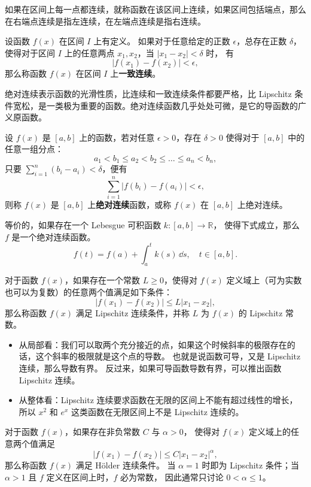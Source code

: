 如果在区间上每一点都连续，就称函数在该区间上连续，如果区间包括端点，那么在右端点连续是指左连续，在左端点连续是指右连续。

\begin{definition}[一致连续]
设函数 $f(x)$ 在区间 $I$ 上有定义。
如果对于任意给定的正数 $\epsilon$，总存在正数 $\delta$，使得对于区间 $I$ 上的任意两点 $x_1,x_2$，当 $|x_1-x_2|<\delta$ 时，
有 \[
|f(x_1)-f(x_2)|<\epsilon,
\] 那么称函数 $f(x)$ 在区间 $I$ 上\textbf{一致连续}。
\end{definition}

绝对连续表示函数的光滑性质，比连续和一致连续条件都要严格，比 Lipschitz 条件宽松，是一类极为重要的函数。绝对连续函数几乎处处可微，是它的导函数的广义原函数。

\begin{definition}[绝对连续]
设 $f(x)$ 是 $[a,b]$ 上的函数，若对任意 $\epsilon>0$，存在 $\delta>0$ 使得对于
$[a,b]$ 中的任意一组分点： \[
a_1<b_1\leq a_2 <b_2 \leq \dots \leq a_n < b_n,
\] 只要 $\sum_{i=1}^n(b_i-a_i)<\delta$，便有 \[
\sum_{i=1}^n|f(b_i)-f(a_i)|<\epsilon,
\]
则称 $f(x)$ 是 $[a,b]$ 上\textbf{绝对连续}函数，或称 $f(x)$ 在 $[a,b]$ 上绝对连续。
\end{definition}

等价的，如果存在一个 Lebesgue 可积函数 $k:[a,b]\to \mathbb{R}$，
使得下式成立，那么 $f$ 是一个绝对连续函数。 \[
f(t)=f(a)+\int^t_a k(s)\,\dd s,\quad t\in [a,b].
\]

\begin{definition}[Lipschitz 连续]
对于函数 $f(x)$，如果存在一个常数 $L\ge 0$，使得对 $f(x)$ 定义域上（可为实数也可以为复数）的任意两个值满足如下条件：
\[
|f(x_1)-f(x_2)|\leq L|x_1-x_2|,
\]
那么称函数 $f(x)$ 满足 Lipschitz 连续条件，并称 $L$ 为 $f(x)$ 的 Lipschitz 常数。
\end{definition}

\begin{itemize}
\item
  从局部看：我们可以取两个充分接近的点，如果这个时候斜率的极限存在的话，这个斜率的极限就是这个点的导数。
  也就是说函数可导，又是 Lipschitz 连续，那么导数有界。
  反过来，如果可导函数导数有界，可以推出函数 Lipschitz 连续。
\item
  从整体看：Lipschitz 连续要求函数在无限的区间上不能有超过线性的增长，
  所以 $x^2$ 和 $e^x$ 这类函数在无限区间上不是 Lipschitz 连续的。
\end{itemize}

\begin{definition}[Hölder 连续]
对于函数 $f(x)$，如果存在非负常数 $C$ 与 $\alpha>0$，
使得对 $f(x)$ 定义域上的任意两个值满足
\[
|f(x_1)-f(x_2)|\leq C|x_1-x_2|^\alpha,
\]
那么称函数 $f(x)$ 满足 Hölder 连续条件。
当 $\alpha=1$ 时即为 Lipschitz 条件；当 $\alpha>1$ 且 $f$ 定义在区间上时，$f$ 必为常数，
因此通常只讨论 $0<\alpha\le 1$。
\end{definition}

